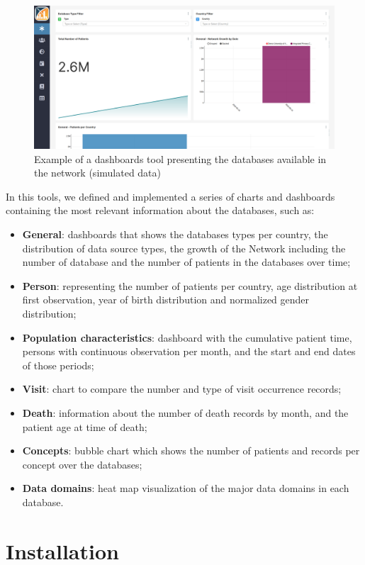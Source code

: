 \documentclass[
]{book}
\providecommand{\tightlist}{%
  \setlength{\itemsep}{0pt}\setlength{\parskip}{0pt}}
\begin{document}
\begin{figure}
\includegraphics[width=1\linewidth]{images/01-intro} \caption{Example of a dashboards tool presenting the databases available in the network (simulated data)}\label{fig:intro}
\end{figure}

In this tools, we defined and implemented a series of charts and dashboards containing the most relevant information about the databases, such as:

\begin{itemize}
\tightlist
\item
  \textbf{General}: dashboards that shows the databases types per country, the distribution of data source types, the growth of the Network including the number of database and the number of patients in the databases over time;
\item
  \textbf{Person}: representing the number of patients per country, age distribution at first observation, year of birth distribution and normalized gender distribution;
\item
  \textbf{Population characteristics}: dashboard with the cumulative patient time, persons with continuous observation per month, and the start and end dates of those periods;
\item
  \textbf{Visit}: chart to compare the number and type of visit occurrence records;
\item
  \textbf{Death}: information about the number of death records by month, and the patient age at time of death;
\item
  \textbf{Concepts}: bubble chart which shows the number of patients and records per concept over the databases;
\item
  \textbf{Data domains}: heat map visualization of the major data domains in each database.
\end{itemize}

\hypertarget{installation}{%
\chapter{Installation}\label{installation}}
\end{document}
